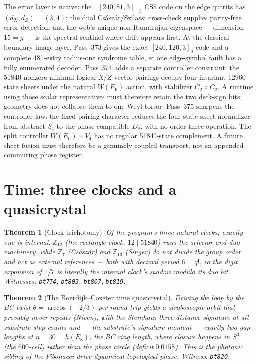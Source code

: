 \documentclass[11pt]{article}
\newtheorem{theorem}{Theorem}[section]
\begin{document}
The error layer is native: the $[[240,81,3]]_3$ CSS code on the edge
qutrits has $(d_X,d_Z)=(3,4)$; the dual
Cs\'asz\'ar/Szilassi cross-check supplies parity-free error detection;
and the web's unique non-Ramanujan eigenspace --- dimension $15=g$ ---
is the spectral sentinel where drift appears first.  At the classical
boundary-image layer, Pass~373 gives the exact $[240,120,3]_3$ code and a
complete 481-entry radius-one syndrome table, so one edge-symbol fault has a
fully enumerated decoder.  Pass~374 adds a separate controller constraint:
the 51840 nonzero minimal logical $X/Z$ vector pairings occupy four invariant
12960-state sheets under the natural $W(E_6)$ action, with stabilizer
$C_2\times C_2$.  A runtime using those scalar representatives must therefore
retain the two deck-sign bits; geometry does not collapse them to one Weyl
torsor.  Pass~375 sharpens the controller law: the fixed pairing character
reduces the four-state sheet normalizer from abstract $S_4$ to the
phase-compatible $D_8$, with no order-three operation.  The split controller
$W(E_6)\times V_4$ has no regular 51840-state complement.  A future sheet
fusion must therefore be a genuinely coupled transport, not an appended
commuting phase register.

\section{Time: three clocks and a quasicrystal}
\label{sec:time}

\begin{theorem}[Clock trichotomy]
Of the program's three natural clocks, exactly one is internal:
$\mathbb{Z}_{12}$ (the rectangle clock, $12\mid 51840$) runs the
selector and duo machinery, while $\mathbb{Z}_7$ (Cs\'asz\'ar) and
$\mathbb{Z}_{13}$ (Singer) do not divide the group order and act as
external references --- both with decimal period $6=q!$, so the digit
expansion of $1/7$ is literally the internal clock's shadow modulo its
duo bit.
\emph{Witnesses: \texttt{bt774}, \texttt{bt803}, \texttt{bt807},
\texttt{bt819}.}
\end{theorem}

\begin{theorem}[The Boerdijk--Coxeter time quasicrystal]
Driving the loop by the BC twist $\theta=\arccos(-2/3)$ per round trip
yields a stroboscopic orbit that provably never repeats (Niven), with
the Steinhaus three-distance signature at all substrate step counts and
--- the substrate's signature moment --- exactly \emph{two} gap lengths
at $n=30=h(E_8)$, the BC ring length, where closure happens in $S^3$
(the $600$-cell) rather than the phase circle (deficit $0.0158$).
This is the photonic sibling of the Fibonacci-drive dynamical
topological phase.
\emph{Witness: \texttt{bt820}.}
\end{theorem}
\end{document}
